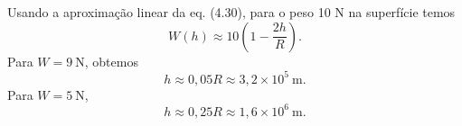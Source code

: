 Usando a aproximação linear da eq. (4.30), para o peso 10 N na superfície temos
\[
W(h) \approx 10\left(1 - \frac{2h}{R}\right).
\]
Para $W=9\ \mathrm{N}$, obtemos
\[
h \approx 0{,}05 R \approx 3{,}2\times10^{5}\ \mathrm{m}.
\]
Para $W=5\ \mathrm{N}$,
\[
h \approx 0{,}25 R \approx 1{,}6\times10^{6}\ \mathrm{m}.
\]
